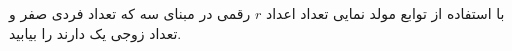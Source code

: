 \EXERCISE
با استفاده از توابع مولد نمایی تعداد اعداد
$r$
رقمی در مبنای سه که تعداد فردی صفر و تعداد زوجی یک دارند را بیابید.